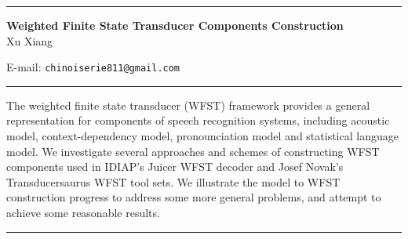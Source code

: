 \documentclass{article}
\begin{document}


\begin{titlepage}
\hrule

\vspace{0.2in}
\begin{center}
{\bf Weighted Finite State Transducer Components Construction\\}
\bigskip
Xu Xiang\\
\smallskip
\date
\bigskip

E-mail: {\tt chinoiserie811@gmail.com}\\

\bigskip

\bigskip

\end{center}

\vspace{2cm}

\hrule

\bigskip

\abstract 
The weighted finite state transducer (WFST) framework provides a general representation for components of speech recognition systems, including acoustic model, context-dependency model, pronounciation model and statistical language model. We investigate several approaches and schemes of constructing WFST components used in IDIAP's Juicer WFST decoder and Josef Novak's Transducersaurus WFST tool sets. We illustrate the model to WFST construction progress to address some more general problems, and attempt to achieve some reasonable results.
\endabstract
\bigskip
\hrule

\end{titlepage}

\tableofcontents \listoffigures \listoftables

\newpage
\setcounter{page}{1}












\newpage
\end{document}
